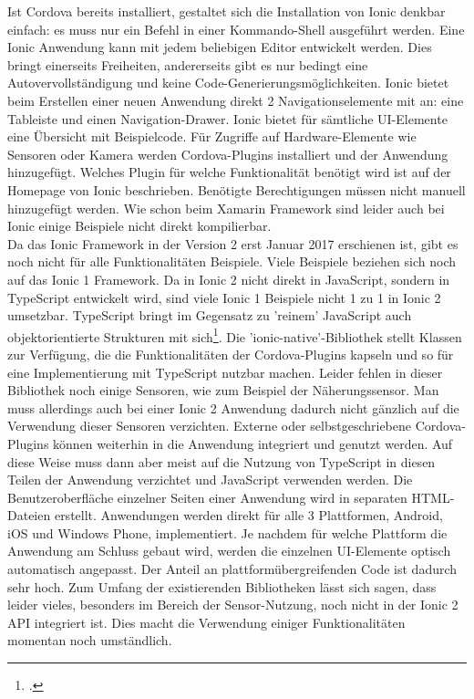 Ist Cordova bereits installiert, gestaltet sich die Installation von Ionic denkbar einfach: es muss nur ein Befehl in einer Kommando-Shell ausgeführt werden. Eine Ionic  Anwendung kann mit jedem beliebigen Editor entwickelt werden. Dies bringt einerseits Freiheiten, andererseits gibt es nur bedingt eine Autovervollständigung und keine Code-Generierungsmöglichkeiten. Ionic bietet beim Erstellen einer neuen Anwendung direkt 2 Navigationselemente mit an: eine Tableiste und einen Navigation-Drawer. Ionic bietet für sämtliche UI-Elemente eine Übersicht mit Beispielcode. Für Zugriffe auf Hardware-Elemente wie Sensoren oder Kamera werden Cordova-Plugins installiert und der Anwendung hinzugefügt. Welches Plugin für welche Funktionalität benötigt wird ist auf der Homepage von Ionic beschrieben. Benötigte Berechtigungen müssen nicht manuell hinzugefügt werden. Wie schon beim Xamarin Framework sind leider auch bei Ionic einige Beispiele nicht direkt kompilierbar.
\\
Da das Ionic Framework in der Version 2 erst Januar 2017 erschienen ist, gibt es noch nicht für alle Funktionalitäten Beispiele. Viele Beispiele beziehen sich noch auf das Ionic 1 Framework. Da in Ionic 2 nicht direkt in JavaScript, sondern in TypeScript entwickelt wird, sind viele Ionic 1 Beispiele nicht 1 zu 1 in Ionic 2 umsetzbar. TypeScript bringt im Gegensatz zu 'reinem' JavaScript auch objektorientierte Strukturen mit sich\footcite{TypeScript}. Die 'ionic-native'-Bibliothek stellt Klassen zur Verfügung, die die Funktionalitäten der Cordova-Plugins kapseln und so für eine Implementierung mit TypeScript nutzbar machen. Leider fehlen in dieser Bibliothek noch einige Sensoren, wie zum Beispiel der Näherungssensor. Man muss allerdings auch bei einer Ionic 2 Anwendung dadurch nicht gänzlich auf die Verwendung dieser Sensoren verzichten. Externe oder selbstgeschriebene Cordova-Plugins können weiterhin in die Anwendung integriert und genutzt werden. Auf diese Weise muss dann aber meist auf die Nutzung von TypeScript in diesen Teilen der Anwendung verzichtet und JavaScript verwenden werden. Die Benutzeroberfläche einzelner Seiten einer Anwendung wird in separaten HTML-Dateien erstellt. Anwendungen werden direkt für alle 3 Plattformen, Android, iOS und Windows Phone, implementiert. Je nachdem für welche Plattform die Anwendung am Schluss gebaut wird, werden die einzelnen UI-Elemente optisch automatisch angepasst. Der Anteil an plattformübergreifenden Code ist dadurch sehr hoch. Zum Umfang der existierenden Bibliotheken lässt sich sagen, dass leider vieles, besonders im Bereich der Sensor-Nutzung, noch nicht in der Ionic 2 API integriert ist. Dies macht die Verwendung einiger Funktionalitäten momentan noch umständlich. 
